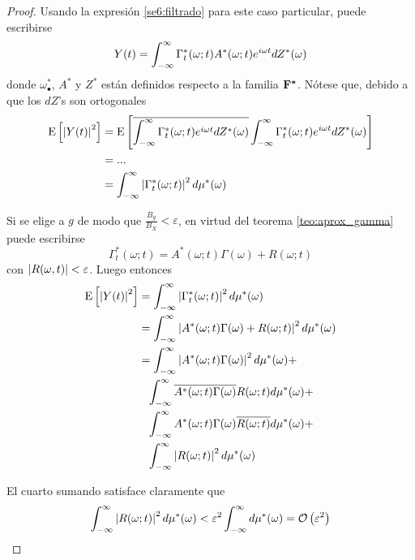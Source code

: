 \begin{proof}
Usando la expresión \ref{se6:filtrado} para este caso particular, puede escribirse
\begin{equation}
Y(t) = \int_{-\infty}^{\infty} \Gamma_t^{*} (\omega; t) A^{*}(\omega; t) e^{i \omega t} dZ^{*}(\omega)
\end{equation}
donde $\omega_\bullet^{*}$, $A^{*}$ y $Z^{*}$ están definidos respecto a la familia $\mathbf{F}^{\boldsymbol{*}}$.
Nótese que, debido a que los $dZ$'s son ortogonales
\begin{align*}
\mathrm{E}\left[ \left| Y(t) \right|^{2} \right] 
&= 
\mathrm{E}\left[ 
\overline{\int_{-\infty}^{\infty} \Gamma_t^{*} (\omega; t) e^{i \omega t} dZ^{*}(\omega)}
\int_{-\infty}^{\infty} \Gamma_t^{*} (\omega; t) e^{i \omega t} dZ^{*}(\omega)  \right]\\
&= ... \\
&= \int_{-\infty}^{\infty} \left| \Gamma_t^{*} (\omega; t) \right|^{2} d\mu^{*}(\omega)
\end{align*}

Si se elige a $g$ de modo que $\frac{B_g}{B_X} < \varepsilon$, en virtud del teorema \ref{teo:aprox_gamma} puede escribirse
\begin{equation}
\Gamma_t^{*}(\omega; t) = A^{*}(\omega; t) \Gamma(\omega) + R(\omega; t)
\end{equation}
con $\left| R(\omega,t) \right| < \varepsilon$. Luego entonces
\begin{align*}
\E{\abso{Y(t)}^{2}} 
&= 
\intR \abso{\Gamma_t^{*} (\omega; t)}^{2} d\mu^{*}(\omega) \\
&= 
\intR \abso{A^{*}(\omega; t) \Gamma(\omega) + R(\omega; t)}^{2} d\mu^{*}(\omega) \\
&= 
\intR \abso{A^{*}(\omega; t) \Gamma(\omega)}^{2} d\mu^{*}(\omega) +\\
&\pheq
\intR \overline{A^{*}(\omega; t) \Gamma(\omega)} R(\omega; t) d\mu^{*}(\omega) +\\
&\pheq
\intR A^{*}(\omega; t) \Gamma(\omega) \overline{ R(\omega; t)} d\mu^{*}(\omega) +\\
&\pheq
\intR \abso{R(\omega; t)}^{2} d\mu^{*}(\omega) 
\end{align*}

El cuarto sumando satisface claramente que
\begin{equation}
\int_{-\infty}^{\infty} \left| R(\omega; t) \right|^{2} d\mu^{*}(\omega)  < \varepsilon^{2} \int_{-\infty}^{\infty} d\mu^{*}(\omega) 
= \mathcal{O}\left( \varepsilon^{2} \right)
\end{equation}


\end{proof}
